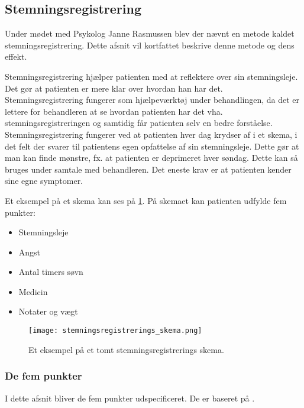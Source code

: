 \subsection{Stemningsregistrering}\label{stemningsleje::stemningsregistrering}
Under mødet med Psykolog Janne Rasmussen\cite[Afsnit 1.3, Møde med Psykolog Janne Rasmussen]{faelles} blev der nævnt en metode kaldet stemningsregistrering.
Dette afsnit vil kortfattet beskrive denne metode og dens effekt.

Stemningsregistrering\cite[Appendiks F, Stemningsregistrering]{faelles} hjælper patienten med at reflektere over sin stemningsleje.
Det gør at patienten er mere klar over hvordan han har det.
Stemningsregistrering fungerer som hjælpeværktøj under behandlingen, da det er lettere for behandleren at se hvordan patienten har det vha. stemningsregistreringen og samtidig får patienten selv en bedre forståelse.
Stemningsregistrering fungerer ved at patienten hver dag krydser af i et skema, i det felt der svarer til patientens egen opfattelse af sin stemningsleje.
Dette gør at man kan finde mønstre, fx. at patienten er deprimeret hver søndag.
Dette kan så bruges under samtale med behandleren.
Det eneste krav er at patienten kender sine egne symptomer.

Et eksempel på et skema kan ses på \cref{figure::stemningsregistrerings_skema}.
På skemaet kan patienten udfylde fem punkter:
\begin{itemize}
	\item Stemningsleje
	\item Angst
	\item Antal timers søvn
	\item Medicin
	\item Notater og vægt
\end{itemize}

\begin{figure}
	\texttt{[image: stemningsregistrerings\_skema.png]}
	\caption{Et eksempel på et tomt stemningsregistrerings skema.}
	\label{figure::stemningsregistrerings_skema}
\end{figure}

\subsubsection{De fem punkter}
I dette afsnit bliver de fem punkter udspecificeret.
De er baseret på \citet[Appendiks F, Stemningsregistrering]{faelles}.
